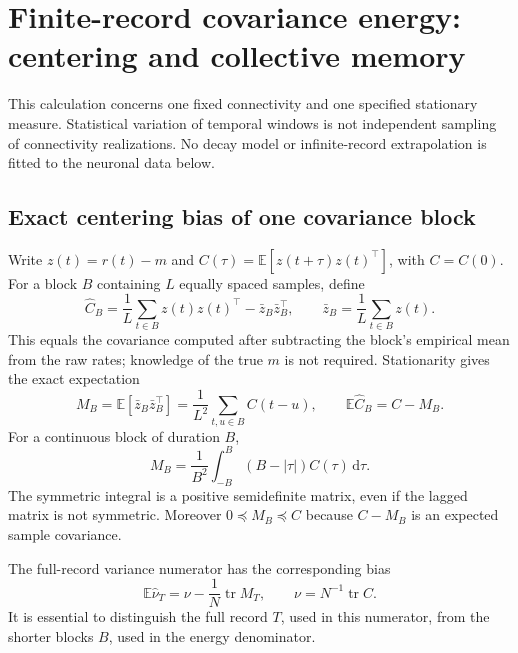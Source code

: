 \section{Finite-record covariance energy: centering and collective memory}
This calculation concerns one fixed connectivity and one specified stationary
measure. Statistical variation of temporal windows is not independent sampling
of connectivity realizations. No decay model or infinite-record extrapolation
is fitted to the neuronal data below.

\subsection{Exact centering bias of one covariance block}
Write $z(t)=r(t)-m$ and
$C(\tau)=\mathbb E[z(t+\tau)z(t)^\top]$, with $C=C(0)$. For a block $B$
containing $L$ equally spaced samples, define
\[
 \widehat C_B=\frac1L\sum_{t\in B}z(t)z(t)^\top-
               \bar z_B\bar z_B^\top,
 \qquad \bar z_B=\frac1L\sum_{t\in B}z(t).
\]
This equals the covariance computed after subtracting the block's empirical
mean from the raw rates; knowledge of the true $m$ is not required. Stationarity
gives the exact expectation
\[
 M_B=\mathbb E[\bar z_B\bar z_B^\top]
     =\frac1{L^2}\sum_{t,u\in B}C(t-u),\qquad
 \boxed{\mathbb E\widehat C_B=C-M_B.}
\]
For a continuous block of duration $B$,
\[
 M_B=\frac1{B^2}\int_{-B}^{B}(B-|\tau|)C(\tau)\,\mathrm d\tau.
\]
The symmetric integral is a positive semidefinite matrix, even if the lagged
matrix is not symmetric. Moreover $0\preceq M_B\preceq C$ because
$C-M_B$ is an expected sample covariance.

The full-record variance numerator has the corresponding bias
\[
 \mathbb E\widehat\nu_T=\nu-\frac1N\operatorname{tr}M_T,
 \qquad \nu=N^{-1}\operatorname{tr}C.
\]
It is essential to distinguish the full record $T$, used in this numerator,
from the shorter blocks $B$, used in the energy denominator.

